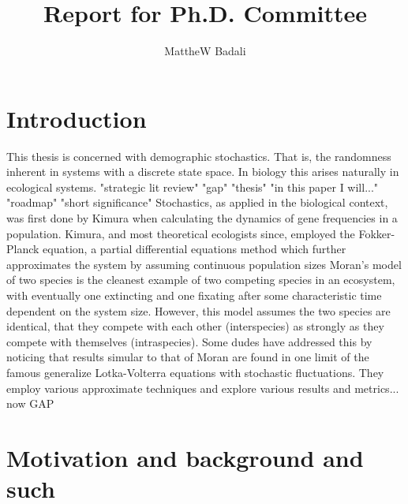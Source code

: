 \documentclass[a4paper,11pt]{article}
\title{Report for Ph.D. Committee}
\author{MattheW Badali}
\numberwithin{equation}{section} %
\begin{document}

\fi


\section{Introduction}

This thesis is concerned with demographic stochastics. That is, the randomness inherent in systems with a discrete state space. 
In biology this arises naturally in ecological systems. 
"strategic lit review"
"gap"
"thesis" "in this paper I will..."
"roadmap"
"short significance"
Stochastics, as applied in the biological context, was first done by Kimura when calculating the dynamics of gene frequencies in a population. %
Kimura, and most theoretical ecologists since, employed the Fokker-Planck equation, a partial differential equations method which further approximates the system by assuming continuous population sizes %
Moran's model of two species is the cleanest example of two competing species in an ecosystem, with eventually one extincting and one fixating after some characteristic time dependent on the system size. 
However, this model assumes the two species are identical, that they compete with each other (interspecies) as strongly as they compete with themselves (intraspecies). 
Some dudes have addressed this by noticing that results simular to that of Moran are found in one limit of the famous generalize Lotka-Volterra equations with stochastic fluctuations. 
They employ various approximate techniques and explore various results and metrics...
now GAP



\section{Motivation and background and such}
\end{document}

